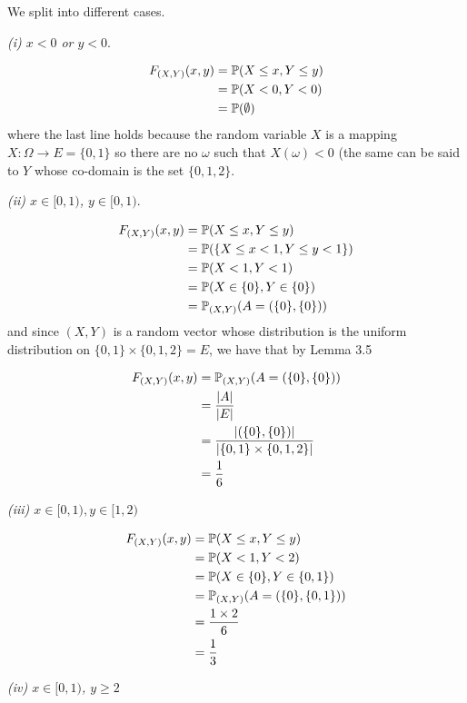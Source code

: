 
We split into different cases. 

\textit{(i) $ x < 0$ or $ y < 0$}. 

\begin{align*}
    F_{(X,Y)} (x,y) &= \P(X \leq x, Y \leq y)\\
		    &= \P(X < 0, Y < 0)\\
		    &= \P(\emptyset)
\end{align*}
where the last line holds because the random variable $ X$ is a mapping $ X: \Omega \to E = \{ 0,1 \} $ 
so there are no $ \omega$ such that $ X(\omega) < 0$ (the same can be said to $ Y$ whose co-domain
is the set $ \{ 0,1,2 \} $.

\textit{(ii) $ x \in [0,1)$, $ y \in [0,1)$}.

\begin{align*}
    F_{(X,Y)} (x,y) &= \P(X \leq x, Y \leq y)\\
		    &= \P( \{ X \leq x < 1, Y \leq y < 1 \} )\\
		    &= \P(X < 1, Y< 1)\\
		    &= \P(X \in \{ 0 \} , Y \in	\{ 0 \} )\\
		    &= \P_{(X,Y)} (A = ( \{ 0 \} , \{ 0 \}))
\end{align*}
and since $ (X,Y)$ is a random vector whose distribution is the uniform distribution on $ \{ 0,1 \}
\times \{ 0,1,2 \} = E $, we have that by Lemma 3.5

\begin{align*}
    F_{(X,Y)} (x,y) &= \P_{(X,Y)} (A = (\{ 0 \}, \{ 0 \}) )\\
		    &= \frac{|A|}{|E|}\\
		    &= \frac{|( \{ 0 \}, \{ 0 \})  |}{| \{ 0,1 \} \times \{ 0,1,2 \}|  }\\
		    &= \frac{1}{6} 
\end{align*}

\textit{(iii) $ x \in [0,1) , y \in [1,2)$}


\begin{align*}
    F_{(X,Y)} (x,y) &= \P(X \leq x, Y \leq y)\\
		    &= \P(X < 1, Y<2)\\
		    &= \P(X \in \{ 0 \} , Y \in \{ 0,1 \})\\
		    &= \P_{(X,Y)} (A = ( \{ 0 \} , \{ 0,1 \} )) \\
		    &= \frac{1 \times 2}{6} \\
		    &= \frac{1}{3} 
\end{align*}

\textit{(iv) $ x \in [0,1)$, $ y \geq 2$}

